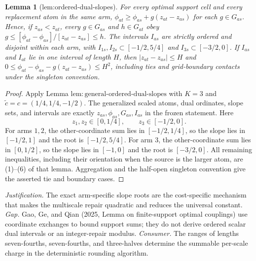 \documentclass{article}
\newtheorem{lemma}{Lemma}
\begin{document}
\begin{lemma}[lem:ordered-dual-slopes]\label{lem:ordered-dual-slopes}
For every optimal support cell and every replacement atom in the same arm, \(\phi_{at}\ge\phi_{as}+g(z_{at}-z_{as})\) for each \(g\in G_{as}\).  Hence, if \(z_{as}<z_{at}\), every \(g\in G_{as}\) and \(h\in G_{at}\) obey \(g\le[\phi_{at}-\phi_{as}]/[z_{at}-z_{as}]\le h\).  The intervals \(I_{as}\) are strictly ordered and disjoint within each arm, with \(I_{1s},I_{2s}\subset[-1/2,5/4]\) and \(I_{3s}\subset[-3/2,0]\).  If \(I_{as}\) and \(I_{at}\) lie in one interval of length \(H\), then \(|z_{at}-z_{as}|\le H\) and \(0\le\phi_{at}-\phi_{as}-g(z_{at}-z_{as})\le H^2\), including ties and grid-boundary contacts under the singleton convention.
\end{lemma}
\begin{proof}
Apply Lemma \(\mathrm{lem{:}general\mbox{-}ordered\mbox{-}dual\mbox{-}slopes}\) with \(K=3\) and \(\widetilde c=c=(1/4,1/4,-1/2)\).  The generalized scaled atoms, dual ordinates, slope sets, and intervals are exactly \(z_{as},\phi_{as},G_{as},I_{as}\) in the frozen statement.  Here
\[
 z_1,z_2\in[0,1/4],\qquad z_3\in[-1/2,0].
\]
For arms \(1,2\), the other-coordinate sum lies in \([-1/2,1/4]\), so the slope lies in \([-1/2,1]\) and the root is \([-1/2,5/4]\).  For arm \(3\), the other-coordinate sum lies in \([0,1/2]\), so the slope lies in \([-1,0]\) and the root is \([-3/2,0]\).  All remaining inequalities, including their orientation when the source is the larger atom, are (1)--(6) of that lemma.  Aggregation and the half-open singleton convention give the asserted tie and boundary cases.
\end{proof}
\par\smallskip\noindent \textit{Justification.} The exact arm-specific slope roots are the cost-specific mechanism that makes the multiscale repair quadratic and reduces the universal constant. \textit{Gap.} Gao, Ge, and Qian (2025, Lemma on finite-support optimal couplings) use coordinate exchanges to bound support sums; they do not derive ordered scalar dual intervals or an integer-repair modulus. \textit{Consumer.} The ranges of lengths seven-fourths, seven-fourths, and three-halves determine the summable per-scale charge in the deterministic rounding algorithm.
\end{document}
